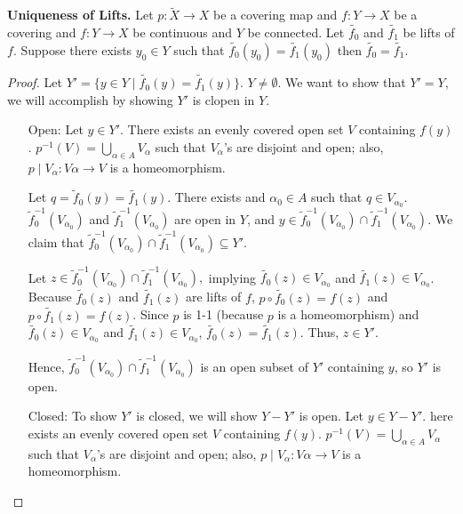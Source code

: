 \begin{lemma}
\textbf{Uniqueness of Lifts.} Let $p:\widetilde{X}\rightarrow X$ be a covering map and $f:Y\rightarrow X$ be a covering and $f:Y\rightarrow X$ be continuous and $Y$ be connected. Let $\widetilde{f_0}$ and $\widetilde{f_1}$ be lifts of $f$. Suppose there exists $y_0\in Y$ such that $\widetilde{f_0}(y_0)=\widetilde{f_1}(y_0)$ then $\widetilde{f_0}=\widetilde{f_1}$.
\end{lemma}
\begin{proof}
Let $Y' =\{y\in Y\mid \widetilde{f_0}(y)=\widetilde{f_1}(y)\}$. $Y\ne\emptyset$. We want to show that $Y' = Y$, we will accomplish by showing $Y'$ is clopen in $Y$. 
\begin{itemize}
\item[Open:] Let $y\in Y'$. There exists an evenly covered open set $V$ containing $f(y)$. $p^{-1}(V)=\displaystyle\bigcup_{\alpha\in A} V_\alpha$ such that $V_{\alpha}$'s are disjoint and open; also, $p\mid V_\alpha:V\alpha\rightarrow V$ is a homeomorphism. 

Let $q= \widetilde{f}_0(y)=\widetilde{f_1}(y)$. There exists and $\alpha_0\in A$ such that $q\in V_{\alpha_0}$. $\widetilde{f}_0^{-1}(V_{\alpha_0})$ and $\widetilde{f}_1^{-1}(V_{\alpha_0})$ are open in $Y$, and $y\in \widetilde{f}_0^{-1}(V_{\alpha_0})\cap\widetilde{f}_1^{-1}(V_{\alpha_0})$.
We claim that $\widetilde{f}_0^{-1}(V_{\alpha_0})\cap\widetilde{f}_1^{-1}(V_{\alpha_0})\subseteq Y'.$

Let $z\in \widetilde{f}_0^{-1}(V_{\alpha_0})\cap\widetilde{f}_1^{-1}(V_{\alpha_0}),$ implying $\widetilde{f_0}(z)\in V_{\alpha_0}$ and $\widetilde{f_1}(z)\in V_{\alpha_0}$. Because $\widetilde{f_0}(z)$ and $\widetilde{f_1}(z)$ are lifts of $f$, $p\circ\widetilde{f_0}(z)=f(z)$ and $p\circ\widetilde{f_1}(z)=f(z)$. Since $p$ is 1-1 (because $p$ is a homeomorphism) and $\widetilde{f_0}(z)\in V_{\alpha_0}$ and $\widetilde{f_1}(z)\in V_{\alpha_0}$, $\widetilde{f_0}(z)=\widetilde{f_1}(z)$. Thus, $z\in Y'$.

Hence, $\widetilde{f}_0^{-1}(V_{\alpha_0})\cap\widetilde{f}_1^{-1}(V_{\alpha_0})$ is an open subset of $Y'$ containing $y$, so $Y'$ is open.
\item[Closed:] To show $Y'$ is closed, we will show $Y-Y'$ is open. Let $y\in Y-Y'$. here exists an evenly covered open set $V$ containing $f(y)$. $p^{-1}(V)=\displaystyle\bigcup_{\alpha\in A} V_\alpha$ such that $V_{\alpha}$'s are disjoint and open; also, $p\mid V_\alpha:V\alpha\rightarrow V$ is a homeomorphism. 


\end{itemize}
\end{proof}
